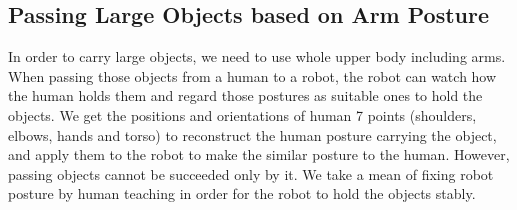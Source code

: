 \subsection{Passing Large Objects based on Arm Posture}
\label{subsec:hold}
In order to carry large objects, we need to use whole upper body including arms. When passing those objects from a human to a robot, the robot can watch how the human holds them and regard those postures as suitable ones to hold the objects. %
We get the positions and orientations of human 7 points (shoulders, elbows, hands and torso) to reconstruct the human posture carrying the object, and apply them to the robot to make the similar posture to the human. However, passing objects cannot be succeeded only by it. We take a mean of fixing robot posture by human teaching in order for the robot to hold the objects stably.\par

